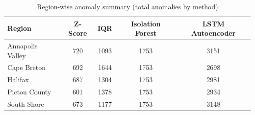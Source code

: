 \begin{table}[H]
\centering
\caption{Region-wise anomaly summary (total anomalies by method)}
\label{tab:app_region_method_summary}
\begin{tabular}{lcccc}
\toprule
Region & Z-Score & IQR & Isolation Forest & LSTM Autoencoder \\
\midrule
Annapolis Valley & 720 & 1093 & 1753 & 3151 \\
Cape Breton      & 692 & 1644 & 1753 & 2698 \\
Halifax          & 687 & 1304 & 1753 & 2981 \\
Pictou County    & 601 & 1378 & 1753 & 2934 \\
South Shore      & 673 & 1177 & 1753 & 3148 \\
\bottomrule
\end{tabular}
\end{table}